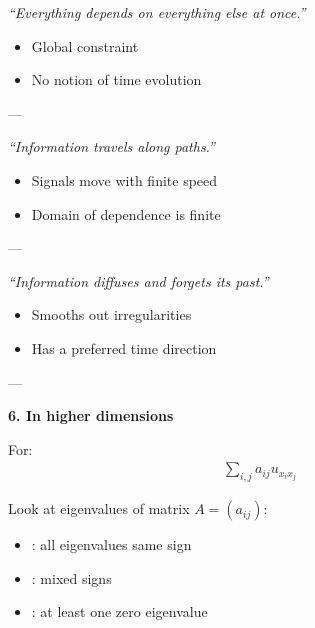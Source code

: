 \documentclass[12pt,a4paper]{report}
\begin{document}
\begin{description}
\begin{description}
\begin{description}
\item {}

\item \textit{“Everything depends on everything else at once.”}

\begin{itemize}
\item Global constraint
\item No notion of time evolution
\end{itemize}

---

\item {}

\item \textit{“Information travels along paths.”}

\begin{itemize}
\item Signals move with finite speed
\item Domain of dependence is finite
\end{itemize}

---

\item {}

\item \textit{“Information diffuses and forgets its past.”}

\begin{itemize}
\item Smooths out irregularities
\item Has a preferred time direction
\end{itemize}

\end{description}
---

\item \textbf{6. In higher dimensions}

For:
\begin{align*}
\sum_{i,j} a_{ij} u_{x_i x_j}
\end{align*}

Look at eigenvalues of matrix $A = (a_{ij})$:

\begin{itemize}
\item {}: all eigenvalues same sign
\item {}: mixed signs
\item {}: at least one zero eigenvalue
\end{itemize}


\end{description}
\end{description}
\end{document}

